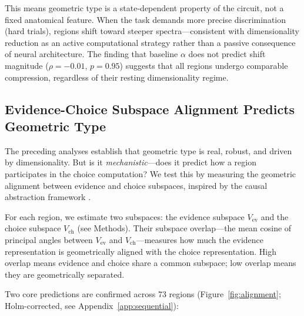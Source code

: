 \documentclass{article}
\begin{document}
This means geometric type is a state-dependent property of the circuit, not a fixed anatomical feature. When the task demands more precise discrimination (hard trials), regions shift toward steeper spectra---consistent with dimensionality reduction as an active computational strategy rather than a passive consequence of neural architecture. The finding that baseline $\alpha$ does not predict shift magnitude ($\rho = -0.01$, $p = 0.95$) suggests that all regions undergo comparable compression, regardless of their resting dimensionality regime.

\subsection{Evidence-Choice Subspace Alignment Predicts Geometric Type}

The preceding analyses establish that geometric type is real, robust, and driven by dimensionality. But is it \emph{mechanistic}---does it predict how a region participates in the choice computation? We test this by measuring the geometric alignment between evidence and choice subspaces, inspired by the causal abstraction framework \citep{geiger2024causal}.

For each region, we estimate two subspaces: the evidence subspace $V_{\text{ev}}$ and the choice subspace $V_{\text{ch}}$ (see Methods). Their subspace overlap---the mean cosine of principal angles between $V_{\text{ev}}$ and $V_{\text{ch}}$---measures how much the evidence representation is geometrically aligned with the choice representation. High overlap means evidence and choice share a common subspace; low overlap means they are geometrically separated.

Two core predictions are confirmed across 73 regions (Figure~\ref{fig:alignment}; Holm-corrected, see Appendix~\ref{app:sequential}):
\end{document}

